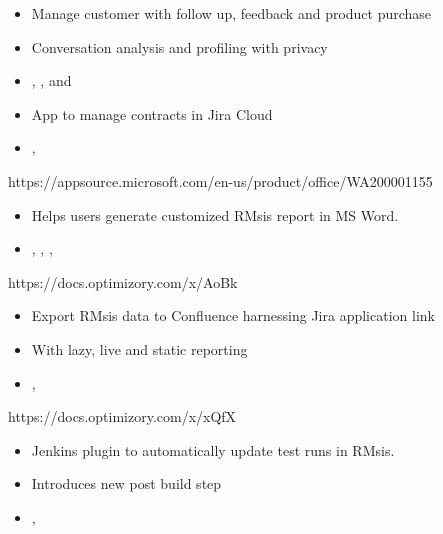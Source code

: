 \documentclass[10pt,a4paper,ragged2e]{altacv}
\begin{document}
\divider

\begin{itemize}
\item Manage customer with follow up, feedback and product purchase
\item Conversation analysis and profiling with privacy
\item {}, , and 
\end{itemize}

\divider

\begin{itemize}
\item App to manage contracts in Jira Cloud
\item {}, 
\end{itemize}



\divider

{https://appsource.microsoft.com/en-us/product/office/WA200001155}
\begin{itemize}
    \item Helps users generate customized RMsis report in MS Word.
    \item {}, , , 
\end{itemize}

\divider




{https://docs.optimizory.com/x/AoBk}
\begin{itemize}
\item Export RMsis data to Confluence harnessing Jira application link
\item With lazy, live and static reporting
\item {}, 
\end{itemize}

\divider

{https://docs.optimizory.com/x/xQfX}
\begin{itemize}
\item Jenkins plugin to automatically update test runs in RMsis.
\item Introduces new post build step
\item {}, 
\end{itemize}
\end{document}
